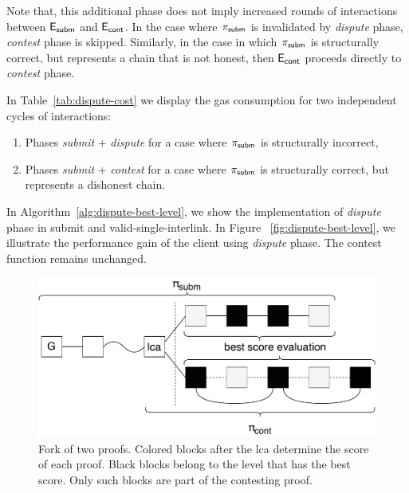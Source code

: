 Note that, this additional phase does not imply increased rounds of
interactions between $\mathsf{E_{subm}}$ and $\mathsf{E_{cont}}$. In the case where $\mathsf{\pi_{subm}}$ is invalidated
by \emph{dispute} phase, \emph{contest} phase is skipped.  Similarly, in the
case in which $\mathsf{\pi_{subm}}$ is structurally correct, but represents a chain that is
not honest, then $\mathsf{E_{cont}}$ proceeds directly to \emph{contest} phase.

In Table~\ref{tab:dispute-cost} we display the gas consumption for
two independent cycles of interactions:
\begin{enumerate}
    \item Phases \emph{submit} + \emph{dispute} for a case where $\mathsf{\pi_{subm}}$
is structurally incorrect,
    \item Phases \emph{submit} + \emph{contest} for a case where
$\mathsf{\pi_{subm}}$ is structurally correct, but represents a dishonest chain.
\end{enumerate}
\noindent
In Algorithm~\ref{alg:dispute-best-level}, we show the implementation of
\emph{dispute} phase in \textsf{submit} and \textsf{valid-single-interlink}. In
Figure ~\ref{fig:dispute-best-level}, we illustrate the performance gain of the
client using \emph{dispute} phase. The \textsf{contest} function remains
unchanged.





\begin{figure}[!h]
    \begin{center}
        \includegraphics[width=1\columnwidth]{figures/blocks-of-best-level.pdf}
    \end{center}
    \caption{Fork of two proofs. Colored blocks after the lca determine the
    score of each proof. Black blocks belong to the level that
    has the best score. Only such blocks are part of the contesting proof.}
    \label{fig:score-at-levels}
\end{figure}

